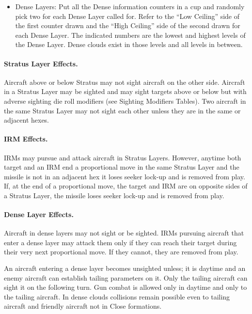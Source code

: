 \begin{advancedrules}
{\begin{itemize}
    \item Dense Layers: Put all the Dense information counters in a cup and randomly pick two for each Dense Layer called for. Refer to the “Low Ceiling” side of the first counter drawn and the “High Ceiling” side of the second drawn for each Dense Layer. The indicated numbers are the lowest and highest levels of the Dense Layer. Dense clouds exist in those levels and all levels in between.   
\end{itemize}
}

\paragraph{Stratus Layer Effects.} Aircraft above or below Stratus may not sight aircraft on the other side. Aircraft in a Stratus Layer may be sighted and may sight targets above or below but with adverse sighting die roll modifiers (see Sighting Modifiers Tables). Two aircraft in the same Stratus Layer may not sight each other unless they are in the same or adjacent hexes.

\paragraph{IRM Effects.} IRMs may pursue and attack aircraft in Stratus Layers. However, anytime both target and an IRM end a proportional move in the same Stratus Layer and the missile is not in an adjacent hex it loses seeker lock-up and is removed from play. If, at the end of a proportional move, the target and IRM are on opposite sides of a Stratus Layer, the missile loses seeker lock-up and is removed from play.

\paragraph{Dense Layer Effects.} Aircraft in dense layers may not sight or be sighted. IRMs pursuing aircraft that enter a dense layer may attack them only if they can reach their target during their very next proportional move. If they cannot, they are removed from play.

An aircraft entering a dense layer becomes unsighted unless; it is daytime and an enemy aircraft can establish tailing parameters on it. Only the tailing aircraft can sight it on the following turn. Gun combat is allowed only in daytime and only to the tailing aircraft. In dense clouds collisions remain possible even to tailing aircraft and friendly aircraft not in Close formations.


\end{advancedrules}
